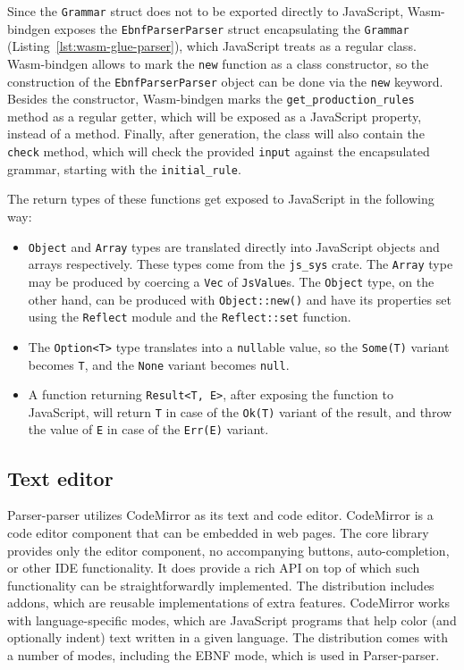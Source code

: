 \documentclass[english,bachelors,forcepolishlogotype]{wizthesis}
\newcommand{\thisproject}{Parser-parser}
\begin{document}
Since the \texttt{Grammar} struct does not to be exported directly to
JavaScript, Wasm-bindgen exposes the \texttt{EbnfParserParser} struct
encapsulating the \texttt{Grammar} (Listing~\ref{lst:wasm-glue-parser}), which
JavaScript treats as a regular class. Wasm-bindgen allows to mark the
\texttt{new} function as a class constructor, so the construction of the
\texttt{EbnfParserParser} object can be done via the \texttt{new} keyword.
Besides the constructor, Wasm-bindgen marks the \texttt{get\_production\_rules}
method as a regular getter, which will be exposed as a JavaScript property,
instead of a method. Finally, after generation, the class will also contain the
\texttt{check} method, which will check the provided \texttt{input} against the
encapsulated grammar, starting with the \texttt{initial\_rule}.

The return types of these functions get exposed to JavaScript in the following
way:
\begin{itemize}
  \item \texttt{Object} and \texttt{Array} types are translated directly into
  JavaScript objects and arrays respectively. These types come from the
  \texttt{js\_sys} crate. The \texttt{Array} type may be produced by coercing a
  \texttt{Vec} of \texttt{JsValue}s. The \texttt{Object} type, on the other
  hand, can be produced with \texttt{Object::new()} and have its properties set
  using the \texttt{Reflect} module and the \texttt{Reflect::set} function.
\end{itemize}

\begin{itemize}
  \item The \texttt{Option<T>} type translates into a \texttt{null}able value,
  so the \texttt{Some(T)} variant becomes \texttt{T}, and the \texttt{None}
  variant becomes \texttt{null}.
  \item A function returning \texttt{Result<T, E>}, after exposing the function
  to JavaScript, will return \texttt{T} in case of the \texttt{Ok(T)} variant of
  the result, and throw the value of \texttt{E} in case of the \texttt{Err(E)}
  variant.
\end{itemize}

\subsection{Text editor}

\thisproject{} utilizes CodeMirror as its text and code editor. CodeMirror is a
code editor component that can be embedded in web pages. The core library
provides only the editor component, no accompanying buttons, auto-completion, or
other IDE functionality. It does provide a rich API on top of which such
functionality can be straightforwardly implemented. The distribution includes
addons, which are reusable implementations of extra features. CodeMirror works
with language-specific modes, which are JavaScript programs that help color (and
optionally indent) text written in a given language. The distribution comes with
a number of modes, including the EBNF mode, which is used in \thisproject{}.
\end{document}
